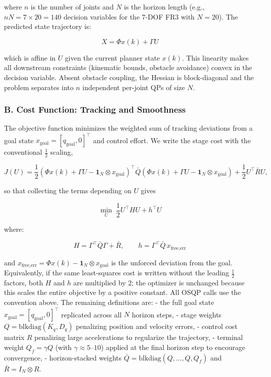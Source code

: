 where \(n\) is the number of joints and \(N\) is the horizon length
(e.g., \(nN = 7\times 20 = 140\) decision variables for the 7-DOF FR3
with \(N=20\)). The predicted state trajectory is:

\[X = \Phi x(k) + \Gamma U\]

which is affine in \(U\) given the current planner state \(x(k)\). This
linearity makes all downstream constraints (kinematic bounds, obstacle
avoidance) convex in the decision variable. Absent obstacle coupling,
the Hessian is block-diagonal and the problem separates into \(n\)
independent per-joint QPs of size \(N\).

\subsubsection{B. Cost Function: Tracking and
Smoothness}\label{b.-cost-function-tracking-and-smoothness}

The objective function minimizes the weighted sum of tracking deviations
from a goal state \(x_{\text{goal}} = [q_{\text{goal}}, 0]^\top\) and
control effort. We write the stage cost with the conventional
\(\tfrac{1}{2}\) scaling,

\[J(U)=\frac{1}{2}\left(\Phi x(k)+\Gamma U-\mathbf{1}_N\otimes x_{\text{goal}}\right)^\top
\bar Q\left(\Phi x(k)+\Gamma U-\mathbf{1}_N\otimes x_{\text{goal}}\right)
+\frac{1}{2}U^\top\bar R U,\]

so that collecting the terms depending on \(U\) gives

\[\min_{U} \; \frac{1}{2} U^\top H U + h^\top U\]

where:

\[H = \Gamma^\top \bar{Q} \Gamma + \bar{R}, \qquad h = \Gamma^\top \bar{Q} \, x_{\text{free,err}}\]

and
\(x_{\text{free,err}} = \Phi x(k) - \mathbf{1}_N \otimes x_{\text{goal}}\)
is the unforced deviation from the goal. Equivalently, if the same
least-squares cost is written without the leading \(\tfrac{1}{2}\)
factors, both \(H\) and \(h\) are multiplied by \(2\); the optimizer is
unchanged because this scales the entire objective by a positive
constant. All OSQP calls use the convention above. The remaining
definitions are: - the full goal state
\(x_{\text{goal}}=[q_{\text{goal}},0]^\top\) replicated across all \(N\)
horizon steps, - stage weights \(Q = \text{blkdiag}(K_q, D_q)\)
penalizing position and velocity errors, - control cost matrix \(R\)
penalizing large accelerations to regularize the trajectory, - terminal
weight \(Q_f = \gamma Q\) (with \(\gamma \approx 5\)--\(10\)) applied at
the final horizon step to encourage convergence, - horizon-stacked
weights \(\bar Q = \mathrm{blkdiag}(Q,\dots,Q,Q_f)\) and
\(\bar R = I_N \otimes R\).

